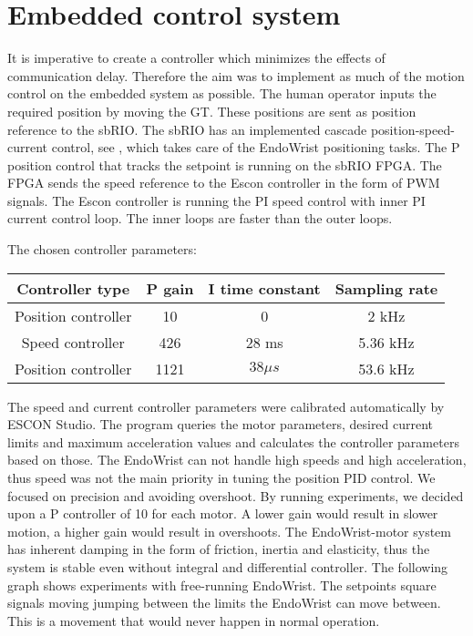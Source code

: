 \section{Embedded control system}

It is imperative to create a controller which minimizes the effects of communication delay. Therefore the aim was to implement as much of the motion control on the embedded system as possible. The human operator  inputs the required position by moving the GT. These positions are sent as position reference to the sbRIO. 
The sbRIO has an implemented cascade position-speed-current control, see , which takes care of the EndoWrist positioning tasks. The P position control that tracks the setpoint is running on the sbRIO FPGA. The FPGA sends the speed reference to the Escon controller in the form of PWM signals. The Escon controller is running the PI speed control with inner PI current control loop. The inner loops are faster than the outer loops.

The chosen controller parameters:

\begin{center}
	\begin{tabular}{ c | c | c | c }
		\hline
		Controller type & P gain & I time constant & Sampling rate \\ \hline
		Position controller & 10 & 0 & 2 kHz \\ \hline
		Speed controller & 426 & 28 ms & 5.36 kHz \\ \hline
		Position controller & 1121 & $38 \mu s$ & 53.6 kHz \\ \hline
	\end{tabular}
\end{center}

The speed and current controller parameters were calibrated automatically by ESCON Studio. The program queries the motor parameters, desired current limits and maximum acceleration values and calculates the controller parameters based on those. The EndoWrist can not handle high speeds and high acceleration, thus speed was not the main priority in tuning the position PID control. We focused on precision and avoiding overshoot. By running experiments, we decided upon a P controller of 10 for each motor. A lower gain would result in slower motion, a higher gain would result in overshoots. The EndoWrist-motor system has inherent damping in the form of friction, inertia and elasticity, thus the system is stable even without integral and differential controller. The following graph shows experiments with free-running EndoWrist. The setpoints square signals moving jumping between the limits the EndoWrist can move between. This is a movement that would never happen in normal operation.


